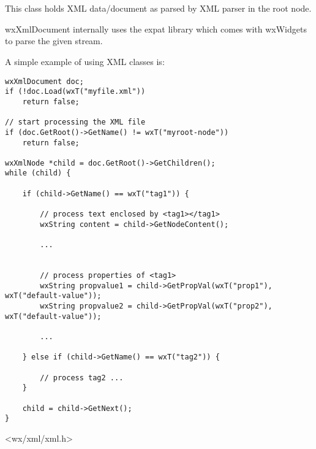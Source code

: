 
\section{}\label{wxxmldocument}

This class holds XML data/document as parsed by XML parser in the root node.

wxXmlDocument internally uses the expat library which comes with wxWidgets to parse the given stream.

A simple example of using XML classes is:

\begin{verbatim}
wxXmlDocument doc;
if (!doc.Load(wxT("myfile.xml"))
    return false;

// start processing the XML file
if (doc.GetRoot()->GetName() != wxT("myroot-node"))
    return false;

wxXmlNode *child = doc.GetRoot()->GetChildren();
while (child) {

    if (child->GetName() == wxT("tag1")) {

        // process text enclosed by <tag1></tag1>
        wxString content = child->GetNodeContent();

        ...


        // process properties of <tag1>
        wxString propvalue1 = child->GetPropVal(wxT("prop1"), wxT("default-value"));
        wxString propvalue2 = child->GetPropVal(wxT("prop2"), wxT("default-value"));

        ...

    } else if (child->GetName() == wxT("tag2")) {

        // process tag2 ...
    }

    child = child->GetNext();
}
\end{verbatim}






<wx/xml/xml.h>


